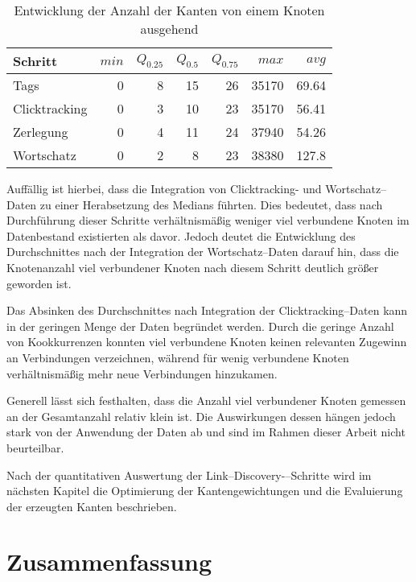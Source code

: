 \begin{table}
\centering
\begin{tabular}{lrrrrrr}
    \toprule
    Schritt & \(min\) & \(Q_{0.25}\) & \(Q_{0.5}\) & \(Q_{0.75}\) & \(max\) & \(avg\) \\
    \midrule
    Tags & \num{0} & \num{8} & \num{15} & \num{26} & \num{35170} & \num{69,64} \\
    Clicktracking & \num{0} & \num{3} & \num{10} & \num{23} & \num{35170} & \num{56,41} \\
    Zerlegung & \num{0} & \num{4} & \num{11} & \num{24} & \num{37940} & \num{54,26} \\
    Wortschatz & \num{0} & \num{2} & \num{8} & \num{23} & \num{38380} & \num{127,8} \\
    \bottomrule
\end{tabular}
\caption{Entwicklung der Anzahl der Kanten von einem Knoten ausgehend}
\label{tab:discovery_edges_per_node}
\end{table}

Auffällig ist hierbei, dass die Integration von Clicktracking- und Wortschatz--Daten zu einer Herabsetzung des Medians führten. Dies bedeutet, dass nach Durchführung dieser Schritte verhältnismäßig weniger viel verbundene Knoten im Datenbestand existierten als davor. Jedoch deutet die Entwicklung des Durchschnittes nach der Integration der Wortschatz--Daten darauf hin, dass die Knotenanzahl viel verbundener Knoten nach diesem Schritt deutlich größer geworden ist.

Das Absinken des Durchschnittes nach Integration der Clicktracking--Daten kann in der geringen Menge der Daten begründet werden. Durch die geringe Anzahl von Kookkurrenzen konnten viel verbundene Knoten keinen relevanten Zugewinn an Verbindungen verzeichnen, während für wenig verbundene Knoten verhältnismäßig mehr neue Verbindungen hinzukamen.

Generell lässt sich festhalten, dass die Anzahl viel verbundener Knoten gemessen an der Gesamtanzahl relativ klein ist. Die Auswirkungen dessen hängen jedoch stark von der Anwendung der Daten ab und sind im Rahmen dieser Arbeit nicht beurteilbar.

Nach der quantitativen Auswertung der Link--Discovery-–Schritte wird im nächsten Kapitel die Optimierung der Kantengewichtungen und die Evaluierung der erzeugten Kanten beschrieben.

\section{Zusammenfassung}